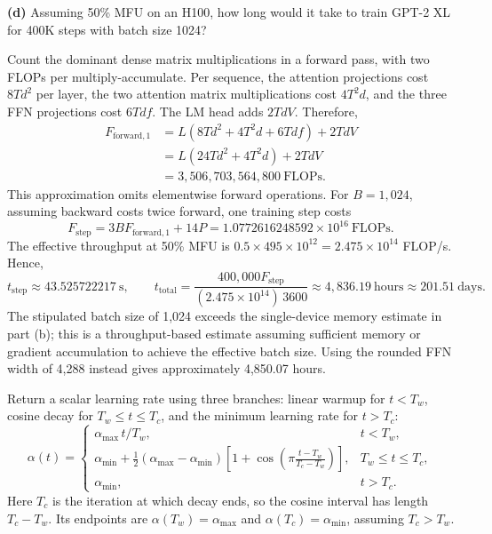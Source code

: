 \textbf{(d)} Assuming 50\% MFU on an H100, how long would it take to train GPT-2 XL for 400K steps with batch size 1024?


Count the dominant dense matrix multiplications in a forward
pass, with two FLOPs per multiply-accumulate. Per sequence, the attention
projections cost $8Td^2$ per layer, the two attention matrix multiplications
cost $4T^2d$, and the three FFN projections cost $6Tdf$. The LM head adds
$2TdV$. Therefore,
\begin{align*}
F_{\mathrm{forward},1}
 &=L(8Td^2+4T^2d+6Tdf)+2TdV\\
 &=L(24Td^2+4T^2d)+2TdV\\
 &=3{,}506{,}703{,}564{,}800\ \mathrm{FLOPs}.
\end{align*}
This approximation omits elementwise forward operations. For $B=1{,}024$,
assuming backward costs twice forward, one training step costs
\[
F_{\mathrm{step}}=3B F_{\mathrm{forward},1}+14P
=1.0772616248592\times10^{16}\ \mathrm{FLOPs}.
\]
The effective throughput at 50\% MFU is
$0.5\times495\times10^{12}=2.475\times10^{14}$ FLOP/s. Hence,
\[
t_{\mathrm{step}}\approx43.525722217\ \mathrm{s},\qquad
t_{\mathrm{total}}
=\frac{400{,}000F_{\mathrm{step}}}{(2.475\times10^{14})\,3600}
\approx\boxed{4{,}836.19\ \mathrm{hours}}
\approx201.51\ \mathrm{days}.
\]
The stipulated batch size of 1,024 exceeds the single-device memory estimate
in part (b); this is a throughput-based estimate assuming sufficient memory
or gradient accumulation to achieve the effective batch size. Using the
rounded FFN width of 4,288 instead gives approximately 4,850.07 hours.




Return a scalar learning rate using three
branches: linear warmup for $t<T_w$, cosine decay for $T_w\leq t\leq T_c$,
and the minimum learning rate for $t>T_c$:
\[
\alpha(t)=
\begin{cases}
\alpha_{\max}\,t/T_w, & t<T_w,\\[2pt]
\alpha_{\min}+\frac12(\alpha_{\max}-\alpha_{\min})
\left[1+\cos\left(\pi\frac{t-T_w}{T_c-T_w}\right)\right],
& T_w\leq t\leq T_c,\\[2pt]
\alpha_{\min}, & t>T_c.
\end{cases}
\]
Here $T_c$ is the iteration at which decay ends, so the cosine interval has
length $T_c-T_w$. Its endpoints are $\alpha(T_w)=\alpha_{\max}$ and
$\alpha(T_c)=\alpha_{\min}$, assuming $T_c>T_w$.


